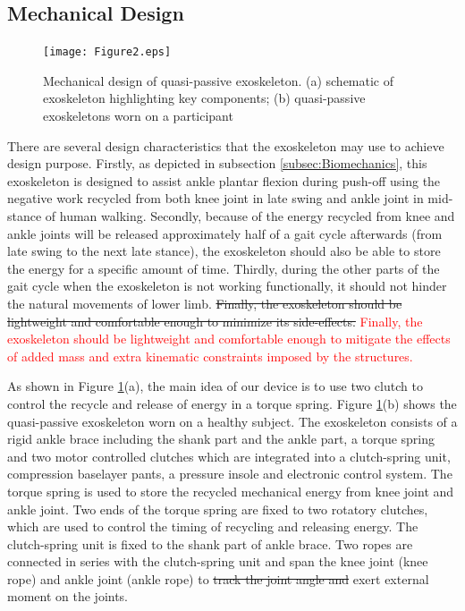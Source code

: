 \documentclass[twocolumn,cleanfoot,10pt]{asme2ej}
\begin{document}
\subsection{Mechanical Design}

\begin{figure}[b]
	\centering
	\texttt{[image: Figure2.eps]}
	\caption{Mechanical design of quasi-passive exoskeleton.
	(a) schematic of exoskeleton highlighting key components; (b) quasi-passive exoskeletons worn on a participant}
	\label{fig:model}   
\end{figure}

There are several design characteristics that the exoskeleton may use to achieve design purpose.
Firstly, as depicted in subsection \ref{subsec:Biomechanics}, this exoskeleton is designed to assist ankle plantar flexion during push-off using the negative work recycled from both knee joint in late swing and ankle joint in mid-stance of human walking.
Secondly, because of the energy recycled from knee and ankle joints will be released approximately half of a gait cycle afterwards (from late swing to the next late stance), the exoskeleton should also be able to store the energy for a specific amount of time.
Thirdly, during the other parts of the gait cycle when the exoskeleton is not working functionally, it should not hinder the natural movements of lower limb.
\sout{Finally, the exoskeleton should be lightweight and comfortable enough to minimize its side-effects.}
\textcolor{red}{Finally, the exoskeleton should be lightweight and comfortable enough to mitigate the effects of added mass and extra kinematic constraints imposed by the structures.}

As shown in Figure \ref{fig:model}(a), the main idea of our device is to use two clutch to control the recycle and release of energy in a torque spring.
Figure \ref{fig:model}(b) shows the quasi-passive exoskeleton worn on a healthy subject.
The exoskeleton consists of a rigid ankle brace including the shank part and the ankle part, a torque spring and two motor controlled clutches which are integrated into a clutch-spring unit, compression baselayer pants, a pressure insole and electronic control system. The torque spring is used to store the recycled mechanical energy from knee joint and ankle joint.
Two ends of the torque spring are fixed to two rotatory clutches, which are used to control the timing of recycling and releasing energy.
The clutch-spring unit is fixed to the shank part of ankle brace.
Two ropes are connected in series with the clutch-spring unit and span the knee joint (knee rope) and ankle joint (ankle rope) to \sout{track the joint angle and }exert external moment on the joints. 
\end{document}
